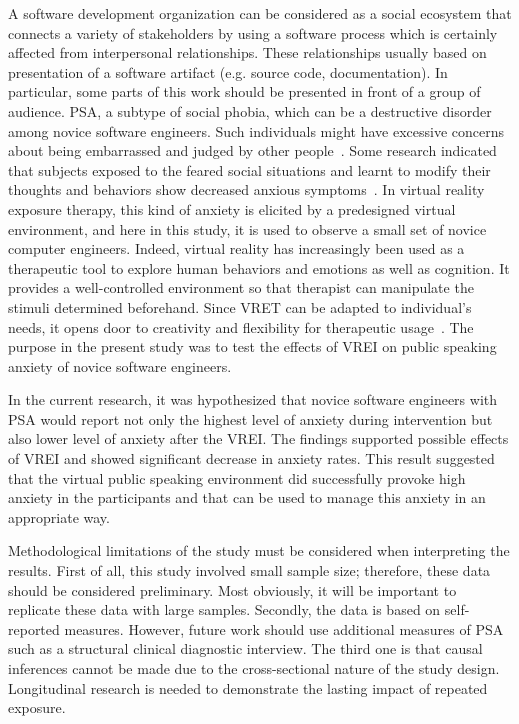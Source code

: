 \documentclass{llncs}
\begin{document}
A software development organization can be considered as a social ecosystem that connects a variety of stakeholders by using a software process which is certainly affected from interpersonal relationships. These relationships usually based on presentation of a software artifact (e.g. source code, documentation). In particular, some parts of this work should be presented in front of a group of audience. PSA, a subtype of social phobia, which can be a destructive disorder among novice software engineers. Such individuals might have excessive concerns about being embarrassed and judged by other people~\cite{ling2012effects}. Some research indicated that subjects exposed to the feared social situations and learnt to modify their thoughts and behaviors show decreased anxious symptoms~\cite{klinger2005virtual}. In virtual reality exposure therapy, this kind of anxiety is elicited by a predesigned virtual environment, and here in this study, it is used to observe a small set of novice computer engineers. Indeed, virtual reality has increasingly been used as a therapeutic tool to explore human behaviors and emotions as well as cognition. It provides a well-controlled environment so that therapist can manipulate the stimuli determined beforehand. Since VRET can be adapted to individual's needs, it opens door to creativity and flexibility for therapeutic usage~\cite{wiederhold1998review}. The purpose in the present study was to test the effects of VREI on public speaking anxiety of novice software engineers. 

In the current research, it was hypothesized that novice software engineers with PSA would report not only the highest level of anxiety during intervention but also lower level of anxiety after the VREI. The findings supported possible effects of VREI and showed significant decrease in anxiety rates. This result suggested that the virtual public speaking environment did successfully provoke high anxiety in the participants and that can be used to manage this anxiety in an appropriate way. 

Methodological limitations of the study must be considered when interpreting the results. First of all, this study involved small sample size; therefore, these data should be considered preliminary. Most obviously, it will be important to replicate these data with large samples. Secondly, the data is based on self-reported measures. However, future work should use additional measures of PSA such as a structural clinical diagnostic interview. The third one is that causal inferences cannot be made due to the cross-sectional nature of the study design. Longitudinal research is needed to demonstrate the lasting impact of repeated exposure. 
\end{document}
